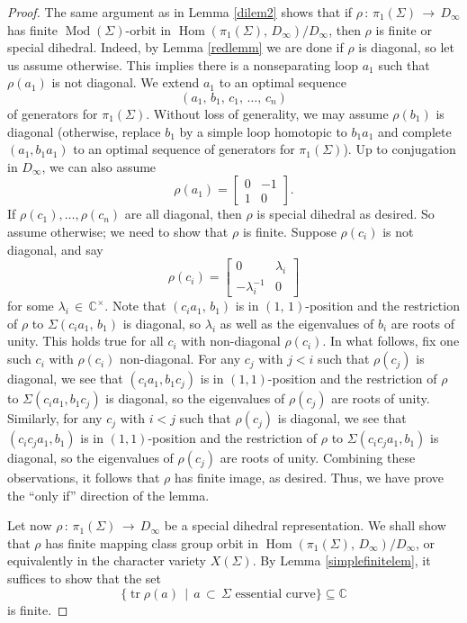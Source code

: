 \documentclass[reqno]{amsart}
\theoremstyle{plain}
\theoremstyle{definition}
\theoremstyle{remark}
\newcommand{\C}{{\mathbb{C}}}
\DeclareMathOperator{\Hom}{Hom}
\DeclareMathOperator{\Mod}{Mod}
\DeclareMathOperator{\tr}{tr}
\begin{document}
\begin{proof}
The same argument as in Lemma \ref{dilem2} shows that if $\rho\,:\,\pi_1(\Sigma)\,\to\, D_\infty$ has
finite $\Mod(\Sigma)$-orbit in $\Hom(\pi_1(\Sigma),\,D_\infty)/D_\infty$, then $\rho$ is finite or special
dihedral. Indeed, by Lemma \ref{redlemm} we are done if $\rho$ is diagonal, so let us assume otherwise. This
implies there is a nonseparating loop $a_1$ such that $\rho(a_1)$ is not diagonal. We extend $a_1$ to an optimal
sequence
$$(a_1,\,b_1,\,c_1,\,\dots,\,c_n)$$
of generators for $\pi_1(\Sigma)$. Without loss of generality, we may assume $\rho(b_1)$ is diagonal (otherwise, replace $b_1$ by a simple loop homotopic to $b_1a_1$ and complete $(a_1,b_1a_1)$ to an optimal sequence of generators for $\pi_1(\Sigma)$). Up to conjugation in $D_\infty$, we can also assume
$$\rho(a_1)=\begin{bmatrix}0 & -1\\ 1 & 0\end{bmatrix}.$$
If $\rho(c_1),\dots,\rho(c_n)$ are all diagonal, then $\rho$ is special dihedral as desired. So assume otherwise; we need to show that $\rho$ is finite. Suppose $\rho(c_i)$ is not diagonal, and say
$$\rho(c_i)=\begin{bmatrix}0 & \lambda_i\\ -\lambda_i^{-1} & 0\end{bmatrix}
$$
for some $\lambda_i\,\in\,\C^\times$. Note that $(c_ia_1,\,b_1)$ is in $(1,\,1)$-position and the restriction of $\rho$ to
$\Sigma(c_ia_1,\,b_1)$ is diagonal, so $\lambda_i$ as well as the eigenvalues of $b_i$ are roots of unity. This holds true for all $c_i$ with non-diagonal $\rho(c_i)$. In what follows, fix one such $c_i$ with $\rho(c_i)$ non-diagonal. For any $c_j$ with $j<i$ such that $\rho(c_j)$ is diagonal, we see that $(c_ia_1,b_1c_j)$ is in $(1,1)$-position and the restriction of $\rho$ to $\Sigma(c_ia_1,b_1c_j)$ is diagonal, so the eigenvalues of $\rho(c_j)$ are roots of unity. Similarly, for any $c_j$ with $i<j$ such that $\rho(c_j)$ is diagonal, we see that $(c_ic_ja_1,b_1)$ is in $(1,1)$-position and the restriction of $\rho$ to $\Sigma(c_ic_ja_1,b_1)$ is diagonal, so the eigenvalues of $\rho(c_j)$ are roots of unity. Combining these observations, it follows that $\rho$ has finite image, as
desired. Thus, we have prove the ``only if'' direction of the lemma.

Let now $\rho\,:\,\pi_1(\Sigma)\,\to\, D_\infty$ be a special dihedral representation. We shall show that 
$\rho$ has finite mapping class group orbit in $\Hom(\pi_1(\Sigma),\,D_\infty)/D_\infty$, or equivalently in the 
character variety $X(\Sigma)$. By Lemma \ref{simplefinitelem}, it suffices to show that the set 
$$\{\tr\rho(a)\,\mid\,a\,\subset\,\Sigma\text{ essential curve}\}\subseteq\C$$ is finite.


\end{proof}
\end{document}
